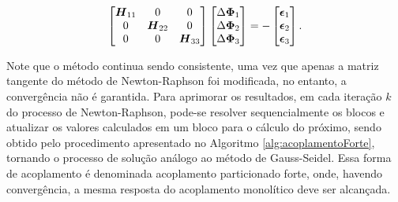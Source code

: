 \begin{equation}
    \begin{bmatrix}
        \boldsymbol{H}_{11} & 0           & 0           \\
        0           & \boldsymbol{H}_{22} & 0           \\
        0           & 0           & \boldsymbol{H}_{33}
    \end{bmatrix}\begin{bmatrix}
        \Delta\boldsymbol{\Phi}_1 \\\Delta\boldsymbol{\Phi}_2\\\Delta\boldsymbol{\Phi}_3
    \end{bmatrix}=-\begin{bmatrix}
        \boldsymbol{\epsilon}_1 \\\boldsymbol{\epsilon}_2\\\boldsymbol{\epsilon}_3
    \end{bmatrix}\text{.}
\end{equation}

Note que o método continua sendo consistente, uma vez que apenas a matriz tangente do método de Newton-Raphson foi modificada, no entanto, a convergência não é garantida.
Para aprimorar os resultados, em cada iteração $k$ do processo de Newton-Raphson, pode-se resolver sequencialmente os blocos e atualizar os valores calculados em um bloco para o cálculo do próximo, sendo obtido pelo procedimento apresentado no Algoritmo \ref{alg:acoplamentoForte}, tornando o processo de solução análogo ao método de Gauss-Seidel. Essa forma de acoplamento é denominada acoplamento particionado forte, onde, havendo convergência, a mesma resposta do acoplamento monolítico deve ser alcançada.

